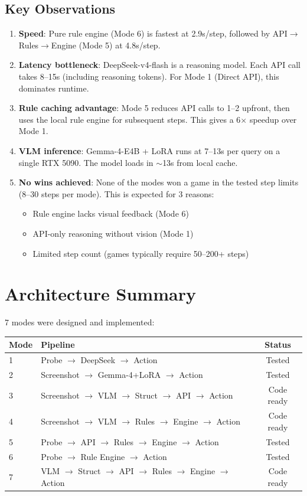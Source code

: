 \documentclass[11pt,a4paper]{article}
\begin{document}
\subsection{Key Observations}
\begin{enumerate}
  \item \textbf{Speed}: Pure rule engine (Mode 6) is fastest at 2.9s/step, followed by 
  API$\to$Rules$\to$Engine (Mode 5) at 4.8s/step.
  
  \item \textbf{Latency bottleneck}: DeepSeek-v4-flash is a reasoning model. Each API call 
  takes 8--15s (including reasoning tokens). For Mode 1 (Direct API), this dominates runtime.
  
  \item \textbf{Rule caching advantage}: Mode 5 reduces API calls to 1--2 upfront, then 
  uses the local rule engine for subsequent steps. This gives a 6$\times$ speedup over Mode 1.
  
  \item \textbf{VLM inference}: Gemma-4-E4B + LoRA runs at 7--13s per query on a single 
  RTX 5090. The model loads in $\sim$13s from local cache.
  
  \item \textbf{No wins achieved}: None of the modes won a game in the tested step limits 
  (8--30 steps per mode). This is expected for 3 reasons:
  \begin{itemize}
    \item Rule engine lacks visual feedback (Mode 6)
    \item API-only reasoning without vision (Mode 1)
    \item Limited step count (games typically require 50--200+ steps)
  \end{itemize}
\end{enumerate}

\section{Architecture Summary}

7 modes were designed and implemented:

\begin{table}[H]
\centering
\begin{tabular}{llc}
\toprule
Mode & Pipeline & Status \\
\midrule
1 & Probe $\to$ DeepSeek $\to$ Action & Tested \\
2 & Screenshot $\to$ Gemma-4+LoRA $\to$ Action & Tested \\
3 & Screenshot $\to$ VLM $\to$ Struct $\to$ API $\to$ Action & Code ready \\
4 & Screenshot $\to$ VLM $\to$ Rules $\to$ Engine $\to$ Action & Code ready \\
5 & Probe $\to$ API $\to$ Rules $\to$ Engine $\to$ Action & Tested \\
6 & Probe $\to$ Rule Engine $\to$ Action & Tested \\
7 & VLM $\to$ Struct $\to$ API $\to$ Rules $\to$ Engine $\to$ Action & Code ready \\
\bottomrule
\end{tabular}
\end{table}
\end{document}
